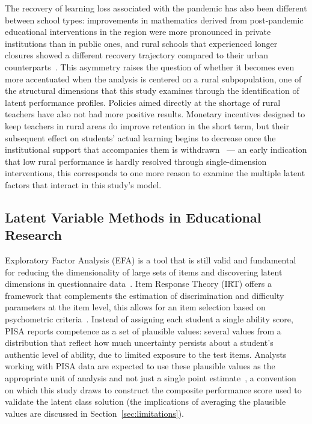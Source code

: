 \documentclass[runningheads]{llncs}
\begin{document}
The recovery of learning loss associated with the pandemic has
also been different between school types: improvements in
mathematics derived from post-pandemic educational interventions
in the region were more pronounced in private institutions than
in public ones, and rural schools that experienced longer
closures showed a different recovery trajectory compared to
their urban counterparts~\cite{delprato2025covid}. This
asymmetry raises the question of whether it becomes even more
accentuated when the analysis is centered on a rural
subpopulation, one of the structural dimensions that this study
examines through the identification of latent performance
profiles. Policies aimed directly at the shortage of rural
teachers have also not had more positive results. Monetary
incentives designed to keep teachers in rural areas do improve
retention in the short term, but their subsequent effect on
students' actual learning begins to decrease once the
institutional support that accompanies them is
withdrawn~\cite{castro2022bonuses} --- an early indication that
low rural performance is hardly resolved through
single-dimension interventions, this corresponds to one more
reason to examine the multiple latent factors that interact in
this study's model.

\subsection{Latent Variable Methods in Educational Research}

Exploratory Factor Analysis (EFA) is a tool that is still valid
and fundamental for reducing the dimensionality of large sets of
items and discovering latent dimensions in questionnaire
data~\cite{fabrigar1999efa}. Item Response Theory (IRT) offers a
framework that complements the estimation of discrimination and
difficulty parameters at the item level, this allows for an item
selection based on psychometric
criteria~\cite{vanderlinden2016irt}. Instead of assigning each
student a single ability score, PISA reports competence as a set
of plausible values: several values from a distribution that
reflect how much uncertainty persists about a student's
authentic level of ability, due to limited exposure to the test
items. Analysts working with PISA data are expected to use these
plausible values as the appropriate unit of analysis and not
just a single point estimate~\cite{vondavier2009plausible}, a
convention on which this study draws to construct the composite
performance score used to validate the latent class solution
(the implications of averaging the plausible values are
discussed in Section~\ref{sec:limitations}).
\end{document}
